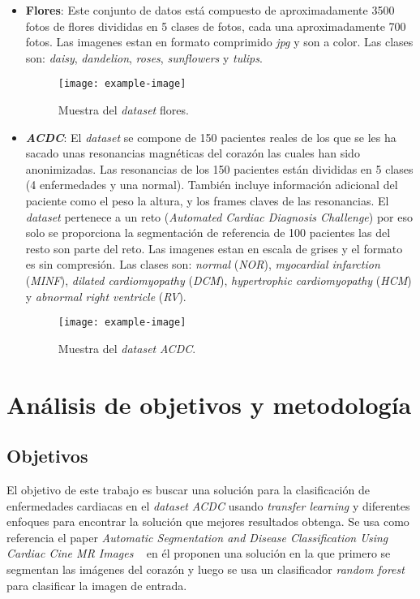 \documentclass[12pt,a4paper]{article}
\begin{document}
\begin{itemize}
\item \textbf{Flores}: Este conjunto de datos está compuesto de aproximadamente 3500 fotos de flores divididas en 5 clases de fotos, cada una aproximadamente 700 fotos. Las imagenes estan en formato comprimido \textit{jpg} y son a color. Las clases son: \textit{daisy}, \textit{dandelion}, \textit{roses}, \textit{sunflowers} y \textit{tulips}.
\begin{figure}[H]
\centering
\texttt{[image: example-image]}
\caption{Muestra del \textit{dataset} flores.}
\end{figure}

\item \textbf{\textit{ACDC}}: El \textit{dataset} se compone de 150 pacientes reales de los que se les ha sacado unas resonancias magnéticas del corazón las cuales han sido anonimizadas. Las resonancias de los 150 pacientes están divididas en 5 clases (4 enfermedades y una normal). También incluye información adicional del paciente como el peso la altura, y los frames claves de las resonancias. El \textit{dataset} pertenece a un reto (\textit{Automated Cardiac Diagnosis Challenge}) por eso solo se proporciona la segmentación de referencia de 100 pacientes las del resto son parte del reto. Las imagenes estan en escala de grises y el formato es sin compresión. Las clases son: \textit{normal} (\textit{NOR}), \textit{myocardial infarction} (\textit{MINF}), \textit{dilated cardiomyopathy} (\textit{DCM}), \textit{hypertrophic cardiomyopathy} (\textit{HCM}) y \textit{abnormal right ventricle} (\textit{RV}).
\begin{figure}[H]
\centering
\texttt{[image: example-image]}
\caption{Muestra del \textit{dataset} \textit{ACDC}.}
\end{figure}




\end{itemize}


\newpage
\section{Análisis de objetivos y metodología}
\subsection{Objetivos}
El objetivo de este trabajo es buscar una solución para la clasificación de enfermedades cardiacas en el \textit{dataset} \textit{ACDC} usando \textit{transfer learning} y diferentes enfoques para encontrar la solución que mejores resultados obtenga. Se usa como referencia el paper \textit{Automatic Segmentation and Disease Classification Using Cardiac Cine MR Images} ~\cite{DBLP:journals/corr/abs-1708-01141} en él proponen una solución en la que primero se segmentan las imágenes del corazón y luego se usa un clasificador \textit{random forest} para clasificar la imagen de entrada.
\bigskip
\end{document}
